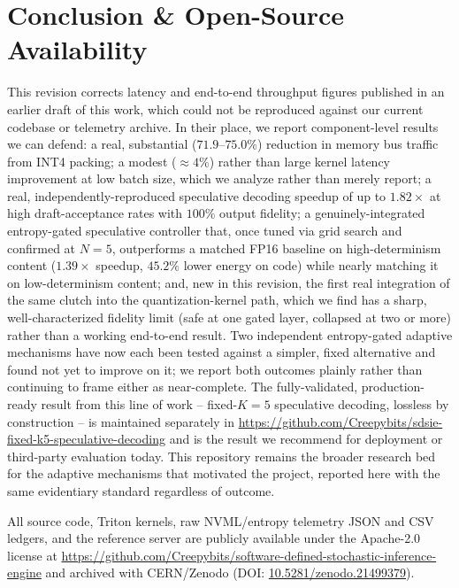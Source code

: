\documentclass[10pt,journal,compsoc,twocolumn]{IEEEtran}
\begin{document}
\section{Conclusion \& Open-Source Availability}
This revision corrects latency and end-to-end throughput figures published in an earlier draft of this work, which could not be reproduced against our current codebase or telemetry archive. In their place, we report component-level results we can defend: a real, substantial ($71.9$--$75.0\%$) reduction in memory bus traffic from INT4 packing; a modest ($\approx 4\%$) rather than large kernel latency improvement at low batch size, which we analyze rather than merely report; a real, independently-reproduced speculative decoding speedup of up to $1.82\times$ at high draft-acceptance rates with $100\%$ output fidelity; a genuinely-integrated entropy-gated speculative controller that, once tuned via grid search and confirmed at $N{=}5$, outperforms a matched FP16 baseline on high-determinism content ($1.39\times$ speedup, $45.2\%$ lower energy on code) while nearly matching it on low-determinism content; and, new in this revision, the first real integration of the same clutch into the quantization-kernel path, which we find has a sharp, well-characterized fidelity limit (safe at one gated layer, collapsed at two or more) rather than a working end-to-end result. Two independent entropy-gated adaptive mechanisms have now each been tested against a simpler, fixed alternative and found not yet to improve on it; we report both outcomes plainly rather than continuing to frame either as near-complete. The fully-validated, production-ready result from this line of work -- fixed-$K{=}5$ speculative decoding, lossless by construction -- is maintained separately in \url{https://github.com/Creepybits/sdsie-fixed-k5-speculative-decoding} and is the result we recommend for deployment or third-party evaluation today. This repository remains the broader research bed for the adaptive mechanisms that motivated the project, reported here with the same evidentiary standard regardless of outcome.

All source code, Triton kernels, raw NVML/entropy telemetry JSON and CSV ledgers, and the reference server are publicly available under the Apache-2.0 license at \url{https://github.com/Creepybits/software-defined-stochastic-inference-engine} and archived with CERN/Zenodo (DOI: \href{https://doi.org/10.5281/zenodo.21499379}{10.5281/zenodo.21499379}).

\balance
\end{document}
